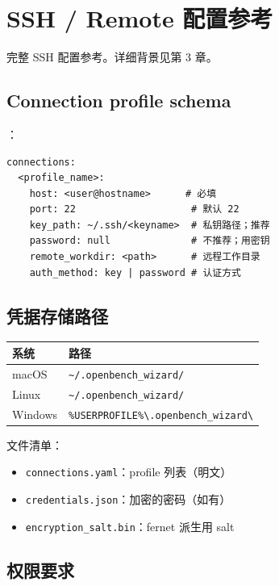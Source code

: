 
\chapter{SSH / Remote 配置参考}

完整 SSH 配置参考。详细背景见第 3 章。

\section{Connection profile schema}

：

\begin{verbatim}
connections:
  <profile_name>:
    host: <user@hostname>      # 必填
    port: 22                    # 默认 22
    key_path: ~/.ssh/<keyname>  # 私钥路径；推荐
    password: null              # 不推荐；用密钥
    remote_workdir: <path>      # 远程工作目录
    auth_method: key | password # 认证方式
\end{verbatim}

\section{凭据存储路径}

\begin{longtable}{p{3.5cm} p{9cm}}
  \toprule
  系统 & 路径 \\
  \midrule
  \endhead
  macOS & \texttt{\~{}/.openbench\_wizard/} \\
  Linux & \texttt{\~{}/.openbench\_wizard/} \\
  Windows & \texttt{\%USERPROFILE\%\textbackslash{}.openbench\_wizard\textbackslash{}} \\
  \bottomrule
\end{longtable}

文件清单：

\begin{itemize}
  \item \texttt{connections.yaml}：profile 列表（明文）
  \item \texttt{credentials.json}：加密的密码（如有）
  \item \texttt{encryption\_salt.bin}：fernet 派生用 salt
\end{itemize}

\section{权限要求}


